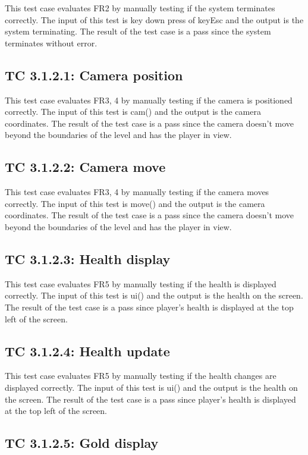 \documentclass[12pt, titlepage]{article}
\begin{document}
This test case evaluates FR2 by manually testing if the system terminates correctly. The input of this test is key down press of keyEsc and the output is the system terminating. The result of the test case is a pass since the system terminates without error.

\subsection*{TC 3.1.2.1: Camera position}

This test case evaluates FR3, 4 by manually testing if the camera is positioned correctly. The input of this test is cam() and the output is the camera coordinates. The result of the test case is a pass since the camera doesn't move beyond the boundaries of the level and has the player in view.

\subsection*{TC 3.1.2.2: Camera move}

This test case evaluates FR3, 4 by manually testing if the camera moves correctly. The input of this test is move() and the output is the camera coordinates. The result of the test case is a pass since the camera doesn't move beyond the boundaries of the level and has the player in view.

\subsection*{TC 3.1.2.3: Health display}

This test case evaluates FR5 by manually testing if the health is displayed correctly. The input of this test is ui() and the output is the health on the screen. The result of the test case is a pass since player's health is displayed at the top left of the screen.

\subsection*{TC 3.1.2.4: Health update}

This test case evaluates FR5 by manually testing if the health changes are displayed correctly. The input of this test is ui() and the output is the health on the screen. The result of the test case is a pass since player's health is displayed at the top left of the screen.

\subsection*{TC 3.1.2.5: Gold display}
\end{document}
